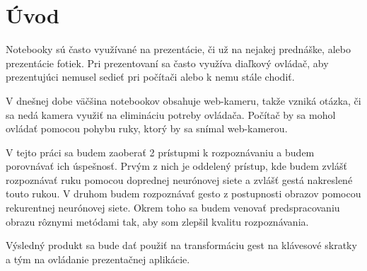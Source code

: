 {}
{}
\chapter*{Úvod}\label{chap:intro}

Notebooky sú často využívané na prezentácie, či už na nejakej prednáške, alebo prezentácie fotiek. Pri prezentovaní sa často využíva diaľkový ovládač, aby prezentujúci nemusel sedieť pri počítači alebo k nemu stále chodiť.

V dnešnej dobe väčšina notebookov obsahuje web-kameru, takže vzniká otázka, či sa nedá kamera využiť na elimináciu potreby ovládača. Počítač by sa mohol ovládať pomocou pohybu ruky, ktorý by sa snímal web-kamerou.

V tejto práci sa budem zaoberať 2 prístupmi k rozpoznávaniu a budem porovnávať ich úspešnosť. Prvým z nich je oddelený prístup, kde budem zvlášť rozpoznávať ruku pomocou doprednej neurónovej siete a zvlášť gestá nakreslené touto rukou.
V druhom budem rozpoznávať gesto z postupnosti obrazov pomocou rekurentnej neurónovej siete. Okrem toho sa budem venovať predspracovaniu obrazu rôznymi metódami tak, aby som zlepšil kvalitu rozpoznávania.

Výsledný produkt sa bude dať použiť na transformáciu gest na klávesové skratky a tým na ovládanie prezentačnej aplikácie.


% 
% 
% 
% 

